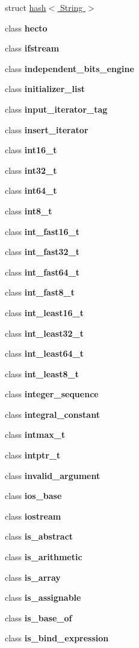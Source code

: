 \begin{DoxyCompactItemize}
struct \hyperlink{structstd_1_1hash_3_01_string_01_4}{hash$<$ String $>$}
\item 
class \textbf{ hecto}
\item 
class \textbf{ ifstream}
\item 
class \textbf{ independent\+\_\+bits\+\_\+engine}
\item 
class \textbf{ initializer\+\_\+list}
\item 
class \textbf{ input\+\_\+iterator\+\_\+tag}
\item 
class \textbf{ insert\+\_\+iterator}
\item 
class \textbf{ int16\+\_\+t}
\item 
class \textbf{ int32\+\_\+t}
\item 
class \textbf{ int64\+\_\+t}
\item 
class \textbf{ int8\+\_\+t}
\item 
class \textbf{ int\+\_\+fast16\+\_\+t}
\item 
class \textbf{ int\+\_\+fast32\+\_\+t}
\item 
class \textbf{ int\+\_\+fast64\+\_\+t}
\item 
class \textbf{ int\+\_\+fast8\+\_\+t}
\item 
class \textbf{ int\+\_\+least16\+\_\+t}
\item 
class \textbf{ int\+\_\+least32\+\_\+t}
\item 
class \textbf{ int\+\_\+least64\+\_\+t}
\item 
class \textbf{ int\+\_\+least8\+\_\+t}
\item 
class \textbf{ integer\+\_\+sequence}
\item 
class \textbf{ integral\+\_\+constant}
\item 
class \textbf{ intmax\+\_\+t}
\item 
class \textbf{ intptr\+\_\+t}
\item 
class \textbf{ invalid\+\_\+argument}
\item 
class \textbf{ ios\+\_\+base}
\item 
class \textbf{ iostream}
\item 
class \textbf{ is\+\_\+abstract}
\item 
class \textbf{ is\+\_\+arithmetic}
\item 
class \textbf{ is\+\_\+array}
\item 
class \textbf{ is\+\_\+assignable}
\item 
class \textbf{ is\+\_\+base\+\_\+of}
\item 
class \textbf{ is\+\_\+bind\+\_\+expression}

\end{DoxyCompactItemize}
